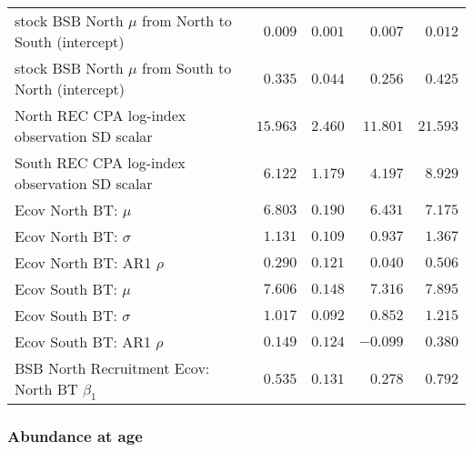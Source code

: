 \documentclass[
]{article}
\begin{document}
\begin{landscape}
\begin{longtable}[t]{lrrrr}
stock BSB North $\mu$ from North to South (intercept) & $0.009$ & $0.001$ & $0.007$ & $0.012$\\
stock BSB North $\mu$ from South to North (intercept) & $0.335$ & $0.044$ & $0.256$ & $0.425$\\
North REC CPA log-index observation SD scalar & $15.963$ & $2.460$ & $11.801$ & $21.593$\\
South REC CPA log-index observation SD scalar & $6.122$ & $1.179$ & $4.197$ & $8.929$\\
\addlinespace
Ecov North BT: $\mu$ & $6.803$ & $0.190$ & $6.431$ & $7.175$\\
Ecov North BT: $\sigma$ & $1.131$ & $0.109$ & $0.937$ & $1.367$\\
Ecov North BT: AR1 $\rho$ & $0.290$ & $0.121$ & $0.040$ & $0.506$\\
Ecov South BT: $\mu$ & $7.606$ & $0.148$ & $7.316$ & $7.895$\\
Ecov South BT: $\sigma$ & $1.017$ & $0.092$ & $0.852$ & $1.215$\\
\addlinespace
Ecov South BT: AR1 $\rho$ & $0.149$ & $0.124$ & $-0.099$ & $0.380$\\
BSB North Recruitment Ecov: North BT $\beta_1$ & $0.535$ & $0.131$ & $0.278$ & $0.792$\\*
\end{longtable}
\end{landscape}

\hypertarget{abundance-at-age}{%
\subsubsection{Abundance at age}\label{abundance-at-age}}
\end{document}
